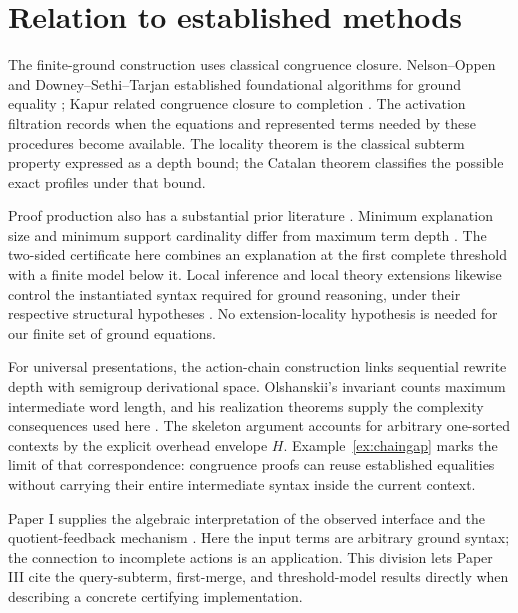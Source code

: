 \section{Relation to established methods}

The finite-ground construction uses classical congruence closure. Nelson--Oppen and Downey--Sethi--Tarjan established foundational algorithms for ground equality \cite{NelsonOppen1980,DowneySethiTarjan1980}; Kapur related congruence closure to completion \cite{Kapur1997}. The activation filtration records when the equations and represented terms needed by these procedures become available. The locality theorem is the classical subterm property expressed as a depth bound; the Catalan theorem classifies the possible exact profiles under that bound.

Proof production also has a substantial prior literature \cite{NieuwenhuisOliveras2005,NieuwenhuisOliveras2007}. Minimum explanation size and minimum support cardinality differ from maximum term depth \cite{FellnerFontainePaleo2017,FlattEtAl2022}. The two-sided certificate here combines an explanation at the first complete threshold with a finite model below it. Local inference and local theory extensions likewise control the instantiated syntax required for ground reasoning, under their respective structural hypotheses \cite{Ganzinger2001,Sofronie2005}. No extension-locality hypothesis is needed for our finite set of ground equations.

For universal presentations, the action-chain construction links sequential rewrite depth with semigroup derivational space. Olshanskii's invariant counts maximum intermediate word length, and his realization theorems supply the complexity consequences used here \cite{Olshanskii2013}. The skeleton argument accounts for arbitrary one-sorted contexts by the explicit overhead envelope $H$. Example~\ref{ex:chaingap} marks the limit of that correspondence: congruence proofs can reuse established equalities without carrying their entire intermediate syntax inside the current context.

Paper I supplies the algebraic interpretation of the observed interface and the quotient-feedback mechanism \cite{ShcherbakovI}. Here the input terms are arbitrary ground syntax; the connection to incomplete actions is an application. This division lets Paper III cite the query-subterm, first-merge, and threshold-model results directly when describing a concrete certifying implementation.
